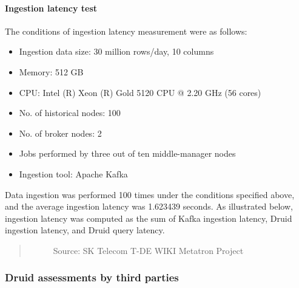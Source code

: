 \documentclass[letterpaper,10pt,english]{sphinxmanual}
\begin{document}
\paragraph{Ingestion latency test}
\label{\detokenize{discovery/part01/druid_tests:id4}}
The conditions of ingestion latency measurement were as follows:
\begin{itemize}
\item {} 
Ingestion data size: 30 million rows/day, 10 columns

\item {} 
Memory: 512 GB

\item {} 
CPU: Intel (R) Xeon (R) Gold 5120 CPU @ 2.20 GHz (56 cores)

\item {} 
No. of historical nodes: 100

\item {} 
No. of broker nodes: 2

\item {} 
Jobs performed by three out of ten middle-manager nodes

\item {} 
Ingestion tool: Apache Kafka

\end{itemize}

Data ingestion was performed 100 times under the conditions specified above, and the average ingestion latency was 1.623439 seconds. As illustrated below, ingestion latency was computed as the sum of Kafka ingestion latency, Druid ingestion latency, and Druid query latency.
\begin{quote}

\begin{figure}[H]
\centering
\capstart

\noindent{}
\caption{Source: SK Telecom T-DE WIKI Metatron Project}\label{\detokenize{discovery/part01/druid_tests:id16}}\end{figure}
\end{quote}


\subsubsection{Druid assessments by third parties}
\label{\detokenize{discovery/part01/druid_tests:druid-3}}
\end{document}
